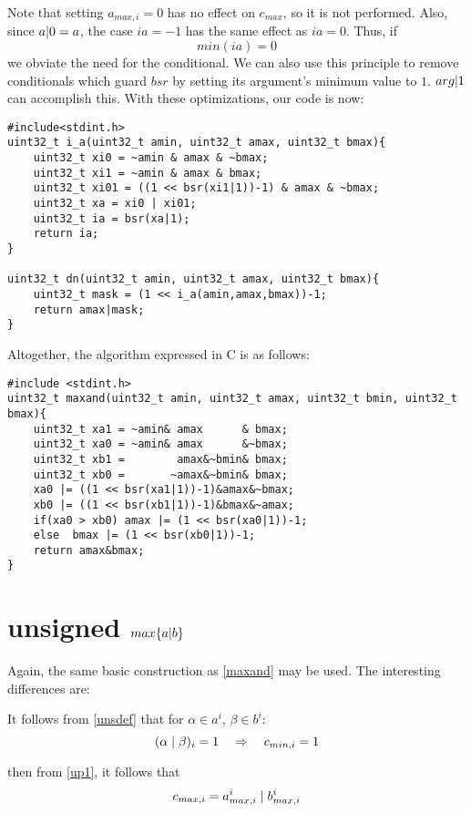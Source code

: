 \documentclass{article}
\begin{document}
Note that setting $a_{max,i} = 0$ has no effect on $c_{max}$, so it is not
performed.
Also, since $a\text{\textbar}0 = a$, the case $ia = -1$ has the same effect
as $ia = 0$. Thus, if
\begin{equation}\label{oho}
min(ia) = 0
\end{equation} 
we obviate the
need for the conditional.
We can also use this principle to remove conditionals which guard 
$bsr$ by setting its argument's minimum value to $1$. 
$arg \text{\textbar} 1$ can accomplish this.
With these optimizations, our code is now:
\begin{lstlisting}
#include<stdint.h>
uint32_t i_a(uint32_t amin, uint32_t amax, uint32_t bmax){
    uint32_t xi0 = ~amin & amax & ~bmax;
    uint32_t xi1 = ~amin & amax & bmax;
    uint32_t xi01 = ((1 << bsr(xi1|1))-1) & amax & ~bmax;
    uint32_t xa = xi0 | xi01;
    uint32_t ia = bsr(xa|1);
    return ia;
}

uint32_t dn(uint32_t amin, uint32_t amax, uint32_t bmax){
    uint32_t mask = (1 << i_a(amin,amax,bmax))-1;
    return amax|mask;
}
\end{lstlisting}

Altogether, the algorithm expressed in C is as follows:
\begin{lstlisting}
#include <stdint.h>
uint32_t maxand(uint32_t amin, uint32_t amax, uint32_t bmin, uint32_t bmax){
    uint32_t xa1 = ~amin& amax      & bmax;
    uint32_t xa0 = ~amin& amax      &~bmax;
    uint32_t xb1 =        amax&~bmin& bmax;
    uint32_t xb0 =       ~amax&~bmin& bmax;
    xa0 |= ((1 << bsr(xa1|1))-1)&amax&~bmax;
    xb0 |= ((1 << bsr(xb1|1))-1)&bmax&~amax;
    if(xa0 > xb0) amax |= (1 << bsr(xa0|1))-1;
    else  bmax |= (1 << bsr(xb0|1))-1;
    return amax&bmax;
}
\end{lstlisting}

\section{unsigned $max\{a\text{\textbar} b\}$}
Again, the same basic construction as \ref{maxand} may be used. 
The interesting differences are:

It follows from \eqref{unsdef} that for $\alpha \in a^i$, $\beta \in b^i$:
\begin{equation}
(\alpha \; \text{\textbar} \; \beta)_i = 1
\quad \Rightarrow \quad c_{min,i} = 1
\end{equation}

then from \eqref{up1}, it follows that 
\begin{equation}\label{maxoreq}
c_{max,i} = a^i_{max,i} \; \text{\textbar}\; b^i_{max,i}
\end{equation}
\end{document}
